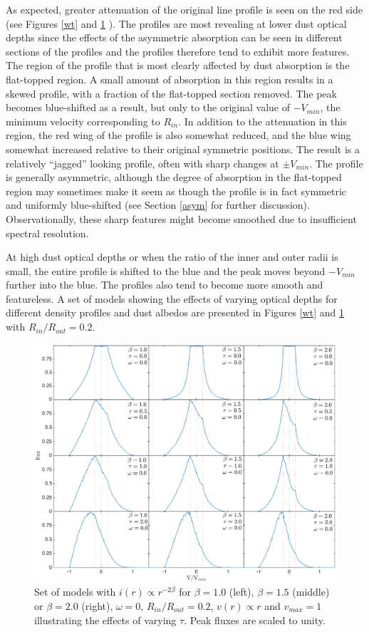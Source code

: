 As expected, greater attenuation of the original line profile is seen on 
the red side (see Figures \ref{wt} and \ref{bt} ).  The profiles are most 
revealing at lower dust optical depths since the effects of the asymmetric 
absorption can be seen in different sections of the profiles and the 
profiles therefore tend to exhibit more features. The region of the 
profile that is most clearly affected by dust absorption is the 
flat-topped region.  A small amount of absorption in this region results 
in a skewed profile, with a fraction of the flat-topped section removed.  
The peak becomes blue-shifted as a result, but only to the original value 
of $-V_{min}$, the minimum velocity corresponding to $R_{in}$. In addition 
to the attenuation in this region, the red wing of the profile is also 
somewhat reduced, and the blue wing somewhat increased relative to their 
original symmetric positions.  The result is a relatively ``jagged'' 
looking profile, often with sharp changes at $\pm V_{min}$.  The profile 
is generally asymmetric, although the degree of absorption in the 
flat-topped region may sometimes make it seem as though the profile is in 
fact symmetric and uniformly blue-shifted (see Section \ref{asym} for 
further discussion).  Observationally, these sharp features might become 
smoothed due to insufficient spectral resolution.

At high dust optical depths or when the ratio of the inner and outer radii 
is small, the entire profile is shifted to the blue and the peak moves 
beyond $-V_{min}$ further into the blue.  The profiles also tend to become 
more smooth and featureless.  A set of models showing the effects of 
varying optical depths for different density profiles and dust albedos are 
presented in Figures \ref{wt} and \ref{bt} with $R_{in}/R_{out} = 0.2$.

\begin{figure}
\centering
\includegraphics[trim =77 0 6 15,clip=true,scale=0.44]{chapters/chapter4/images/params/D/D_all2}
\caption{Set of models with $i(r) \propto r^{-2\beta}$ for $\beta=1.0$ (left), $\beta=1.5$ (middle) or $\beta=2.0$ (right), $\omega=0$, 
$R_{in}/R_{out}=0.2$, $v(r) \propto r$ and $v_{max}=1$ illustrating the effects of varying 
$\tau$.  Peak fluxes are scaled to unity.}
\label{bt}
\end{figure}


